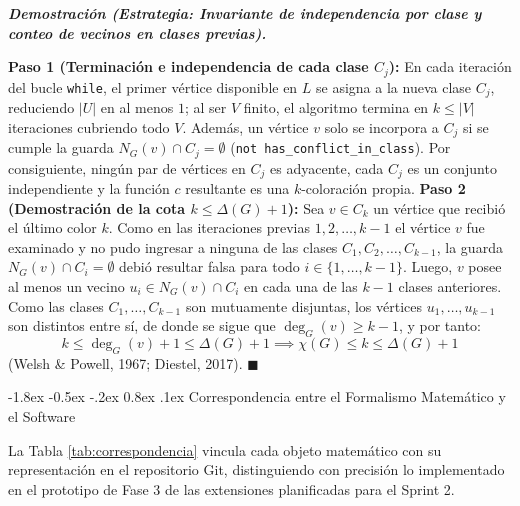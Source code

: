 \documentclass[12pt,a4paper]{article}
\makeatletter
\renewcommand\section{\@startsection {section}{1}{\z@}%
                                   {-1.8ex \@plus -0.5ex \@minus -.2ex}%
                                   {0.8ex \@plus.1ex}%
                                   {\normalfont\large\bfseries}}
\theoremstyle{definition}
\newenvironment{demostracion}[1][Demostración]{%
    \begin{singlespace}\small\noindent\textbf{\textit{#1.}}
}{%
    \hfill$\blacksquare$\end{singlespace}\vspace{0.25em}
}
\makeatother
\begin{document}
\begin{demostracion}[Demostración (Estrategia: Invariante de independencia por clase y conteo de vecinos en clases previas)]
\textbf{Paso 1 (Terminación e independencia de cada clase $C_j$):} En cada iteración del bucle \texttt{while}, el primer vértice disponible en $L$ se asigna a la nueva clase $C_j$, reduciendo $|U|$ en al menos $1$; al ser $V$ finito, el algoritmo termina en $k \le |V|$ iteraciones cubriendo todo $V$. Además, un vértice $v$ solo se incorpora a $C_j$ si se cumple la guarda $N_G(v) \cap C_j = \emptyset$ (\texttt{not has\_conflict\_in\_class}). Por consiguiente, ningún par de vértices en $C_j$ es adyacente, cada $C_j$ es un conjunto independiente y la función $c$ resultante es una $k$-coloración propia.
\textbf{Paso 2 (Demostración de la cota $k \le \Delta(G) + 1$):} Sea $v \in C_k$ un vértice que recibió el último color $k$. Como en las iteraciones previas $1, 2, \dots, k-1$ el vértice $v$ fue examinado y no pudo ingresar a ninguna de las clases $C_1, C_2, \dots, C_{k-1}$, la guarda $N_G(v) \cap C_i = \emptyset$ debió resultar falsa para todo $i \in \{1, \dots, k-1\}$. Luego, $v$ posee al menos un vecino $u_i \in N_G(v) \cap C_i$ en cada una de las $k - 1$ clases anteriores. Como las clases $C_1, \dots, C_{k-1}$ son mutuamente disjuntas, los vértices $u_1, \dots, u_{k-1}$ son distintos entre sí, de donde se sigue que $\deg_G(v) \ge k - 1$, y por tanto:
\[
k \le \deg_G(v) + 1 \le \Delta(G) + 1 \implies \chi(G) \le k \le \Delta(G) + 1
\]
(Welsh \& Powell, 1967; Diestel, 2017).
\end{demostracion}

\section{Correspondencia entre el Formalismo Matemático y el Software}

La Tabla \ref{tab:correspondencia} vincula cada objeto matemático con su representación en el repositorio Git, distinguiendo con precisión lo implementado en el prototipo de Fase 3 de las extensiones planificadas para el Sprint 2.
\end{document}
